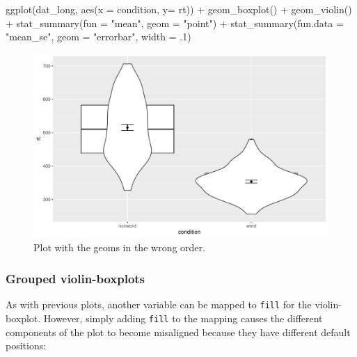 \documentclass[
  english,
  doc,floatsintext]{apa6}
\newenvironment{Shaded}{\begin{snugshade}}{\end{snugshade}}
\newcommand{\AttributeTok}[1]{\textcolor[rgb]{0.77,0.63,0.00}{#1}}
\newcommand{\DecValTok}[1]{\textcolor[rgb]{0.00,0.00,0.81}{#1}}
\newcommand{\FunctionTok}[1]{\textcolor[rgb]{0.00,0.00,0.00}{#1}}
\newcommand{\NormalTok}[1]{#1}
\newcommand{\SpecialCharTok}[1]{\textcolor[rgb]{0.00,0.00,0.00}{#1}}
\newcommand{\StringTok}[1]{\textcolor[rgb]{0.31,0.60,0.02}{#1}}
\begin{document}
\begin{Shaded}
\begin{Highlighting}[]
\FunctionTok{ggplot}\NormalTok{(dat\_long, }\FunctionTok{aes}\NormalTok{(}\AttributeTok{x =}\NormalTok{ condition, }\AttributeTok{y=}\NormalTok{ rt)) }\SpecialCharTok{+}
  \FunctionTok{geom\_boxplot}\NormalTok{() }\SpecialCharTok{+}  
  \FunctionTok{geom\_violin}\NormalTok{() }\SpecialCharTok{+}
  \FunctionTok{stat\_summary}\NormalTok{(}\AttributeTok{fun =} \StringTok{"mean"}\NormalTok{, }\AttributeTok{geom =} \StringTok{"point"}\NormalTok{) }\SpecialCharTok{+}
  \FunctionTok{stat\_summary}\NormalTok{(}\AttributeTok{fun.data =} \StringTok{"mean\_se"}\NormalTok{, }\AttributeTok{geom =} \StringTok{"errorbar"}\NormalTok{, }\AttributeTok{width =}\NormalTok{ .}\DecValTok{1}\NormalTok{)}
\end{Highlighting}
\end{Shaded}

\begin{figure}

{\centering \includegraphics[width=1\linewidth]{images/viobox1b-1} 

}

\caption{Plot with the geoms in the wrong order.}\label{fig:viobox1b}
\end{figure}

\hypertarget{grouped-violin-boxplots}{%
\subsubsection{Grouped violin-boxplots}\label{grouped-violin-boxplots}}

As with previous plots, another variable can be mapped to \texttt{fill} for the violin-boxplot. However, simply adding \texttt{fill} to the mapping causes the different components of the plot to become misaligned because they have different default positions:
\end{document}
